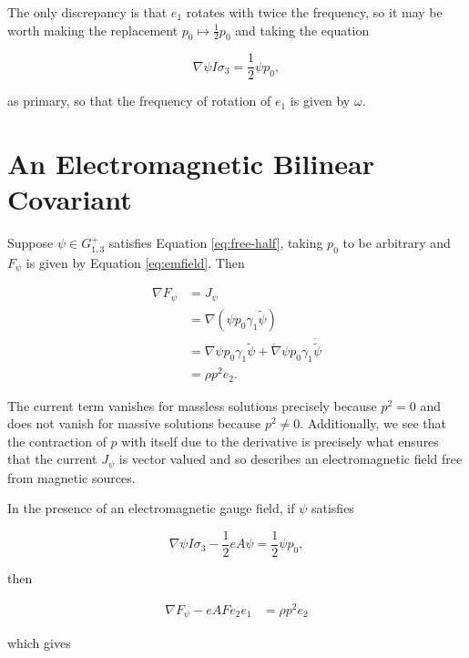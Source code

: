 \documentclass{article}
\begin{document}
    The only discrepancy is that $e_1$ rotates with twice the frequency, so it may be worth making the replacement $p_0 \mapsto \frac{1}{2} p_0$ and taking the equation

    \begin{equation}
      \nabla \psi I \sigma_3 = \frac{1}{2} \psi p_0,\label{eq:free-half}
    \end{equation}

    as primary, so that the frequency of rotation of $e_1$ is given by $\omega$.

    \section{An Electromagnetic Bilinear Covariant}\label{electromagnetism}

    Suppose $\psi \in G_{1,3}^+$ satisfies Equation \ref{eq:free-half}, taking $p_0$ to be arbitrary and $F_\psi$ is given by Equation \ref{eq:emfield}. Then

    \begin{align}
      \nabla F_\psi &= J_\psi\\
      &= \nabla (\psi p_0 \gamma_1 \widetilde \psi)\\
      &= \nabla \psi p_0 \gamma_1 \widetilde \psi + \dot \nabla \psi p_0 \gamma_1 \dot{\widetilde \psi} \\
      &= \rho p^2 e_2.
    \end{align}

    The current term vanishes for massless solutions precisely because $p^2 = 0$ and does not vanish for massive solutions because $p^2 \not= 0$. Additionally, we see that the contraction of $p$ with itself due to the derivative is precisely what ensures that the current $J_\psi$ is vector valued and so describes an electromagnetic field free from magnetic sources.

    In the presence of an electromagnetic gauge field, if $\psi$ satisfies

    \begin{equation}
      \nabla \psi I \sigma_3 - \frac{1}{2} e A \psi = \frac{1}{2} \psi p_0,
    \end{equation}

    then

    \begin{align}
      \nabla F_\psi - e A F e_2 e_1
      &= \rho p^2 e_2
    \end{align}

    which gives
\end{document}
